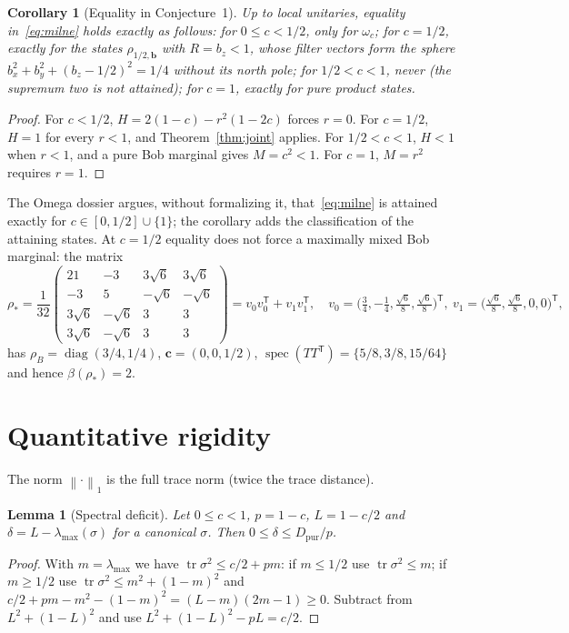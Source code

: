 \documentclass[11pt]{article}
\newtheorem{lemma}[theorem]{Lemma}
\newtheorem{corollary}[theorem]{Corollary}
\theoremstyle{remark}\newtheorem{remark}[theorem]{Remark}
\DeclareMathOperator{\tr}{tr}\DeclareMathOperator{\diag}{diag}
\DeclareMathOperator{\spec}{spec}
\newcommand{\norm}[1]{\left\lVert#1\right\rVert}
\newcommand{\cv}{\bm c}\newcommand{\av}{\bm a}\newcommand{\bv}{\bm b}
\newcommand{\Dp}{D_{\mathrm{pur}}}
\begin{document}
\begin{corollary}[Equality in Conjecture~1]\label{cor:milne-equality}
Up to local unitaries, equality in~\eqref{eq:milne} holds exactly as follows:
for $0\le c<1/2$, only for $\omega_c$; for $c=1/2$, exactly for the states
$\rho_{1/2,\bv}$ with $R=b_z<1$, whose filter vectors form the sphere
$b_x^2+b_y^2+(b_z-1/2)^2=1/4$ without its north pole; for $1/2<c<1$, never
(the supremum two is not attained); for $c=1$, exactly for pure product states.
\end{corollary}
\begin{proof}
For $c<1/2$, $H=2(1-c)-r^2(1-2c)$ forces $r=0$. For $c=1/2$, $H=1$ for every
$r<1$, and Theorem~\ref{thm:joint} applies. For $1/2<c<1$, $H<1$ when $r<1$,
and a pure Bob marginal gives $M=c^2<1$. For $c=1$, $M=r^2$ requires $r=1$.
\end{proof}
The Omega dossier argues, without formalizing it, that~\eqref{eq:milne} is
attained exactly for $c\in[0,1/2]\cup\{1\}$; the corollary adds the
classification of the attaining states. At $c=1/2$ equality does not force a
maximally mixed Bob marginal: the matrix
\[
 \rho_*=\frac1{32}\begin{pmatrix}
 21&-3&3\sqrt6&3\sqrt6\\
 -3&5&-\sqrt6&-\sqrt6\\
 3\sqrt6&-\sqrt6&3&3\\
 3\sqrt6&-\sqrt6&3&3
 \end{pmatrix}
 =v_0v_0^{\mathsf T}+v_1v_1^{\mathsf T},\quad
 v_0=\bigl(\tfrac34,-\tfrac14,\tfrac{\sqrt6}8,\tfrac{\sqrt6}8\bigr)^{\mathsf T},\
 v_1=\bigl(\tfrac{\sqrt6}8,\tfrac{\sqrt6}8,0,0\bigr)^{\mathsf T},
\]
has $\rho_B=\diag(3/4,1/4)$, $\cv=(0,0,1/2)$,
$\spec(TT^{\mathsf T})=\{5/8,3/8,15/64\}$ and hence $\beta(\rho_*)=2$.

\section{Quantitative rigidity}\label{sec:rigidity}

The norm $\norm{\cdot}_1$ is the full trace norm (twice the trace distance).

\begin{lemma}[Spectral deficit]\label{lem:slack}
Let $0\le c<1$, $p=1-c$, $L=1-c/2$ and $\delta=L-\lambda_{\max}(\sigma)$ for a
canonical $\sigma$. Then $0\le\delta\le\Dp/p$.
\end{lemma}
\begin{proof}
With $m=\lambda_{\max}$ we have $\tr\sigma^2\le c/2+pm$: if $m\le1/2$ use
$\tr\sigma^2\le m$; if $m\ge1/2$ use $\tr\sigma^2\le m^2+(1-m)^2$ and
$c/2+pm-m^2-(1-m)^2=(L-m)(2m-1)\ge0$. Subtract from $L^2+(1-L)^2$ and use
$L^2+(1-L)^2-pL=c/2$.
\end{proof}
\end{document}
